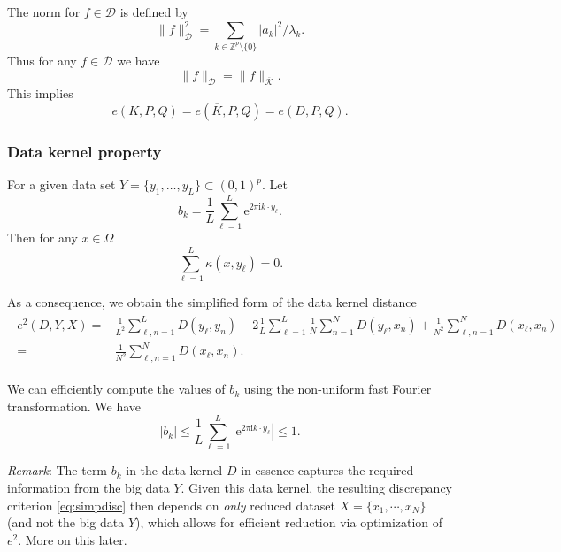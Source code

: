 \documentclass[12pt]{article}
\begin{document}
The norm for $f \in \mathcal{D}$ is defined by
\begin{equation*}
\|f\|^2_{\mathcal{D}} = \sum_{k \in \mathbb{Z}^p \setminus \{0\}} |a_k|^2/ \lambda_k.
\end{equation*}
Thus for any $f \in \mathcal{D}$ we have
\begin{equation*}
\|f\|_{\mathcal{D}} = \|f\|_{\overline{\mathcal{K}}}.
\end{equation*}
This implies
\begin{equation*}
e(K, P, Q) = e(\overline{K}, P, Q) = e(D, P, Q).
\end{equation*}


\subsubsection*{Data kernel property}

For a given data set $Y = \{y_1, \ldots, y_L\} \subset (0,1)^p$. Let
\begin{equation*}
b_k = \frac{1}{L} \sum_{\ell=1}^L \mathrm{e}^{2\pi \mathrm{i} k \cdot y_\ell}.
\end{equation*}
Then for any $x \in \Omega$
\begin{equation*}
\sum_{\ell=1}^L \kappa(x,y_\ell) = 0.
\end{equation*}

As a consequence, we obtain the simplified form of the data kernel distance
\begin{align}
\begin{split}
e^2(D, Y, X) = & \frac{1}{L^2} \sum_{\ell,n = 1}^L D(y_\ell,y_n) - 2 \frac{1}{L} \sum_{\ell=1}^L \frac{1}{N} \sum_{n=1}^N D(y_\ell, x_n) + \frac{1}{N^2} \sum_{\ell, n=1}^N D(x_\ell, x_n) \\ = &  \frac{1}{N^2} \sum_{\ell,n =1}^N D(x_\ell, x_n).
\label{eq:simpdisc}
\end{split}
\end{align}

We can efficiently compute the values of $b_k$ using the non-uniform fast Fourier transformation. We have
\begin{equation*}
|b_k| \le \frac{1}{L} \sum_{\ell=1}^L \left| \mathrm{e}^{2\pi \mathrm{i} k \cdot y_\ell} \right| \le 1.
\end{equation*}

\textit{Remark}: The term $b_k$ in the data kernel $D$ in essence captures the required information from the big data $Y$. Given this data kernel, the resulting discrepancy criterion \eqref{eq:simpdisc} then depends on \textit{only} reduced dataset $X = \{x_1, \cdots, x_N\}$ (and not the big data $Y$), which allows for efficient reduction via optimization of $e^2$. More on this later.
\end{document}
